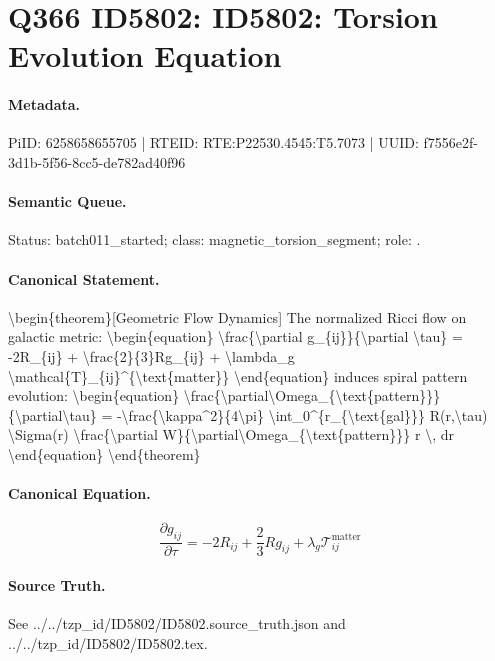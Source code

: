 \section*{Q366 ID5802: ID5802: Torsion Evolution Equation}
\paragraph{Metadata.}
PiID: 6258658655705 | RTEID: RTE:P22530.4545:T5.7073 | UUID: f7556e2f-3d1b-5f56-8cc5-de782ad40f96

\paragraph{Semantic Queue.}
Status: batch011\_started; class: magnetic\_torsion\_segment; role: .

\paragraph{Canonical Statement.}
\textbackslash{}begin\{theorem\}[Geometric Flow Dynamics] The normalized Ricci flow on galactic metric: \textbackslash{}begin\{equation\} \textbackslash{}frac\{\textbackslash{}partial g\_\{ij\}\}\{\textbackslash{}partial \textbackslash{}tau\} = -2R\_\{ij\} + \textbackslash{}frac\{2\}\{3\}Rg\_\{ij\} + \textbackslash{}lambda\_g \textbackslash{}mathcal\{T\}\_\{ij\}\textasciicircum{}\{\textbackslash{}text\{matter\}\} \textbackslash{}end\{equation\} induces spiral pattern evolution: \textbackslash{}begin\{equation\} \textbackslash{}frac\{\textbackslash{}partial\textbackslash{}Omega\_\{\textbackslash{}text\{pattern\}\}\}\{\textbackslash{}partial\textbackslash{}tau\} = -\textbackslash{}frac\{\textbackslash{}kappa\textasciicircum{}2\}\{4\textbackslash{}pi\} \textbackslash{}int\_0\textasciicircum{}\{r\_\{\textbackslash{}text\{gal\}\}\} R(r,\textbackslash{}tau) \textbackslash{}Sigma(r) \textbackslash{}frac\{\textbackslash{}partial W\}\{\textbackslash{}partial\textbackslash{}Omega\_\{\textbackslash{}text\{pattern\}\}\} r \textbackslash{}, dr \textbackslash{}end\{equation\} \textbackslash{}end\{theorem\}

\paragraph{Canonical Equation.}
\[
\begin{equation} \frac{\partial g_{ij}}{\partial \tau} = -2R_{ij} + \frac{2}{3}Rg_{ij} + \lambda_g \mathcal{T}_{ij}^{\text{matter}} \end{equation}
\]

\paragraph{Source Truth.}
See ../../tzp\_id/ID5802/ID5802.source\_truth.json and ../../tzp\_id/ID5802/ID5802.tex.
